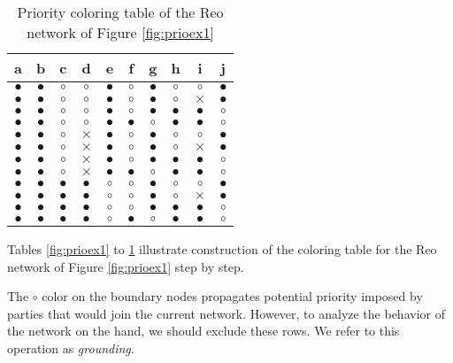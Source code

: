 \begin{table}[H]
\centering
\begin{tabular}{|c|c|c|c|c|c|c|c|c|c|}
		\hline
			a & b &c & d &e &  f & g & h & i & j\\
 \hline
  $\bullet$ &$\bullet$ &$\circ$ &$\circ$ &$\bullet$ &$\circ$ &$\bullet$ &$\circ$ &$\circ$ &$\bullet$  \\ \hline$\bullet$ &$\bullet$ &$\circ$ &$\circ$ &$\bullet$ &$\circ$ &$\bullet$ &$\circ$ &$\times$ &$\bullet$  \\ \hline$\bullet$ &$\bullet$ &$\circ$ &$\circ$ &$\bullet$ &$\circ$ &$\bullet$ &$\bullet$ &$\bullet$ &$\circ$  \\ \hline$\bullet$ &$\bullet$ &$\circ$ &$\circ$ &$\bullet$ &$\bullet$ &$\circ$ &$\bullet$ &$\bullet$ &$\circ$  \\ \hline$\bullet$ &$\bullet$ &$\circ$ &$\times$ &$\bullet$ &$\circ$ &$\bullet$ &$\circ$ &$\circ$ &$\bullet$  \\ \hline$\bullet$ &$\bullet$ &$\circ$ &$\times$ &$\bullet$ &$\circ$ &$\bullet$ &$\circ$ &$\times$ &$\bullet$  \\ \hline$\bullet$ &$\bullet$ &$\circ$ &$\times$ &$\bullet$ &$\circ$ &$\bullet$ &$\bullet$ &$\bullet$ &$\circ$  \\ \hline$\bullet$ &$\bullet$ &$\circ$ &$\times$ &$\bullet$ &$\bullet$ &$\circ$ &$\bullet$ &$\bullet$ &$\circ$  \\ \hline$\bullet$ &$\bullet$ &$\bullet$ &$\bullet$ &$\circ$ &$\circ$ &$\bullet$ &$\circ$ &$\circ$ &$\bullet$  \\ \hline$\bullet$ &$\bullet$ &$\bullet$ &$\bullet$ &$\circ$ &$\circ$ &$\bullet$ &$\circ$ &$\times$ &$\bullet$  \\ \hline$\bullet$ &$\bullet$ &$\bullet$ &$\bullet$ &$\circ$ &$\circ$ &$\bullet$ &$\bullet$ &$\bullet$ &$\circ$  \\ \hline$\bullet$ &$\bullet$ &$\bullet$ &$\bullet$ &$\circ$ &$\bullet$ &$\circ$ &$\bullet$ &$\bullet$ &$\circ$  \\   \hline \end{tabular}
\caption{Priority coloring table of the Reo network of Figure \ref{fig:prioex1}}
    \label{tab:mesalk}
\end{table}

Tables \ref{fig:prioex1} to \ref{tab:mesalk} illustrate construction of the coloring table for the Reo network of Figure \ref{fig:prioex1} step by step.

The $\circ$ color on the boundary nodes propagates potential priority imposed by parties that would join the current network.
However, to analyze the behavior of the network on the hand, we should exclude these rows. We refer to this operation as \emph{grounding}.

